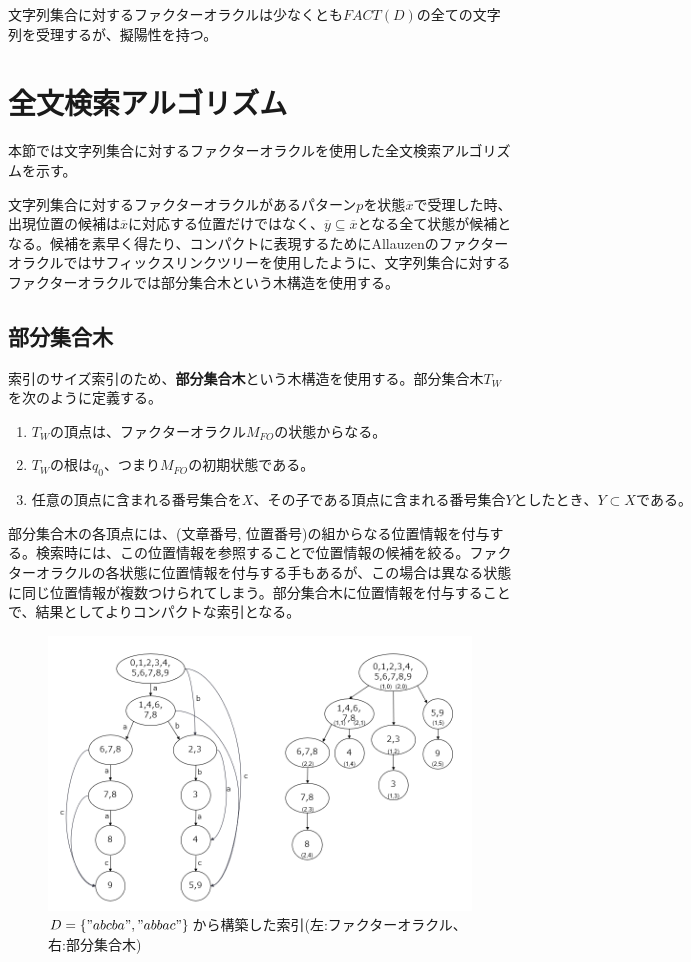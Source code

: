 \documentclass[11pt,a4paper]{jreport}
\begin{document}
  文字列集合に対するファクターオラクルは少なくとも$FACT(D)$の全ての文字列を受理するが、擬陽性を持つ。

  \section{全文検索アルゴリズム}
  本節では文字列集合に対するファクターオラクルを使用した全文検索アルゴリズムを示す。

  文字列集合に対するファクターオラクルがあるパターン$p$を状態$\overline{x}$で受理した時、出現位置の候補は$\overline{x}$に対応する位置だけではなく、$\overline{y} \subseteq \overline{x}$となる全て状態が候補となる。候補を素早く得たり、コンパクトに表現するためにAllauzenのファクターオラクルではサフィックスリンクツリーを使用したように、文字列集合に対するファクターオラクルでは部分集合木という木構造を使用する。
  \subsection{部分集合木}
  索引のサイズ索引のため、\textbf{部分集合木}という木構造を使用する。部分集合木$T_W$を次のように定義する。

  \begin{enumerate}
    \item $T_Wの頂点は、ファクターオラクルM_{FO}の状態からなる。$
    \item $T_Wの根はq_0、つまりM_{FO}の初期状態である。$
    \item $任意の頂点に含まれる番号集合をX、その子である頂点に含まれる番号集合Yとしたとき、Y \subset Xである。$
  \end{enumerate}

  部分集合木の各頂点には、(文章番号, 位置番号)の組からなる位置情報を付与する。検索時には、この位置情報を参照することで位置情報の候補を絞る。ファクターオラクルの各状態に位置情報を付与する手もあるが、この場合は異なる状態に同じ位置情報が複数つけられてしまう。部分集合木に位置情報を付与することで、結果としてよりコンパクトな索引となる。

  \begin{figure}[htbp]
    \centering
    \includegraphics[width=15cm]{subcon.png}
    \caption{$D=\{"abcba", "abbac"\}$から構築した索引(左:ファクターオラクル、右:部分集合木)}
  \end{figure}
\end{document}
